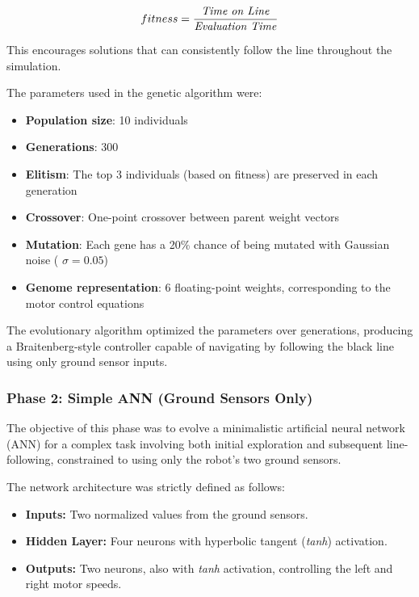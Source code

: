 \documentclass[final,5p,times,twocolumn,authoryear]{elsarticle}
\begin{document}
\begin{equation}
    fitness= \frac{\text{\textit{Time on Line}}}{\text{\textit{Evaluation Time}}}
\end{equation}

This encourages solutions that can consistently follow the line throughout the simulation.

The parameters used in the genetic algorithm were:

\begin{itemize}
    \item \textbf{Population size}: 10 individuals
    \item \textbf{Generations}: 300
    \item \textbf{Elitism}: The top 3 individuals (based on fitness) are preserved in each generation
    \item \textbf{Crossover}: One-point crossover between parent weight vectors
    \item \textbf{Mutation}: Each gene has a 20\% chance of being mutated with Gaussian noise ( $\sigma = 0.05$)
    \item \textbf{Genome representation}: 6 floating-point weights, corresponding to the motor control equations
\end{itemize}

The evolutionary algorithm optimized the parameters over generations, producing a Braitenberg-style controller capable of navigating by following the black line using only ground sensor inputs.



\subsubsection{Phase 2: Simple ANN (Ground Sensors Only)}

The objective of this phase was to evolve a minimalistic artificial neural network (ANN) for a complex task involving both initial exploration and subsequent line-following, constrained to using only the robot’s two ground sensors.

The network architecture was strictly defined as follows:
\begin{itemize}
    \item \textbf{Inputs:} Two normalized values from the ground sensors.
    \item \textbf{Hidden Layer:} Four neurons with hyperbolic tangent (\textit{tanh}) activation.
    \item \textbf{Outputs:} Two neurons, also with \textit{tanh} activation, controlling the left and right motor speeds.
\end{itemize}
\end{document}

